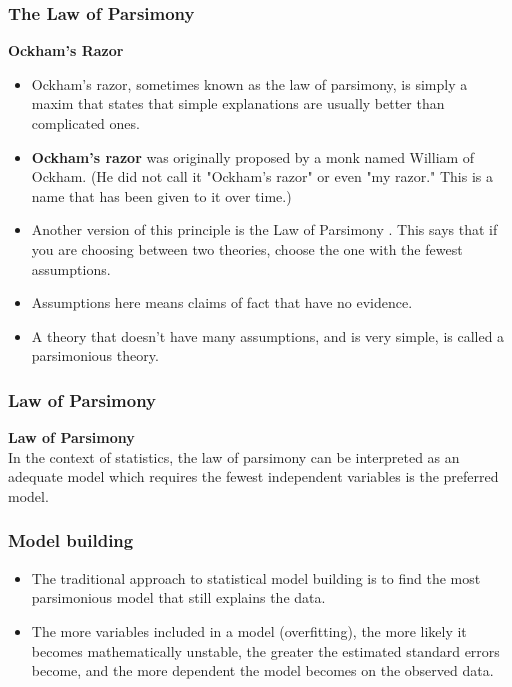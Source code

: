 \documentclass[PredictiveAnalytics101.tex]{subfiles}
\begin{document}
\begin{frame}
	\Large
	\frametitle{The Law of Parsimony}
	\textbf{Ockham's Razor}
	\begin{itemize}
		\item Ockham's razor, sometimes known as the law of parsimony, is simply a maxim that states that simple explanations are usually better than complicated ones. \item \textbf{Ockham's razor} was originally proposed by a monk named William of Ockham. (He did not call it "Ockham's razor" or even "my razor." This is a name that has been given to it over time.)
	\end{itemize}
	
\end{frame}
\begin{frame}
	\Large
	\begin{itemize}
		\item Another version of this principle is the Law of Parsimony . This says that if you are choosing between two theories, choose the one with the fewest assumptions. 
		\item Assumptions here means claims of fact that have no evidence.
		\item A theory that doesn't have many assumptions, and is very simple, is called a parsimonious theory.
	\end{itemize}
\end{frame}
\begin{frame}
	\frametitle{Law of Parsimony} 
	\Large
	\textbf{Law of Parsimony}\\
	In the context of statistics, the law of parsimony can be interpreted as an adequate model which requires the fewest independent variables is the preferred model.
\end{frame}
\begin{frame}
	\Large
	\frametitle{Model building}
	\begin{itemize}
		\item The traditional approach to statistical model building is to find the most parsimonious model that still explains the data. 
		\item The more variables included in a model (overfitting), the more likely it becomes mathematically unstable, the greater the estimated standard errors become, and the more dependent the model becomes on the observed data. 
	\end{itemize}
\end{frame}
\end{document}
